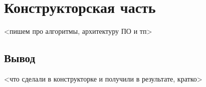 \chapter{Конструкторская часть}

<пишем про алгоритмы, архитектуру ПО и тп>

\section*{Вывод}

<что сделали в конструкторке и получили в результате, кратко>

\clearpage
